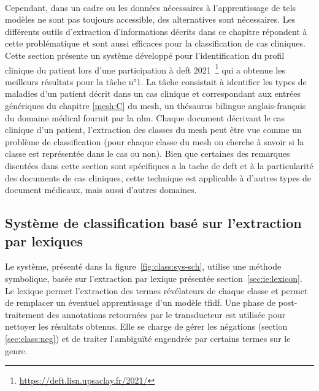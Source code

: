 \paragraph{}
Cependant, dans un cadre ou les données nécessaires à l'apprentissage de tels modèles ne sont pas toujours accessible, des alternatives sont nécessaires.
Les différents outils d'extraction d'informations décrits dans ce chapitre répondent à cette problématique et sont aussi efficaces pour la classification de cas cliniques.
Cette section présente un système développé pour l'identification du profil clinique du patient \cite{hiotDOINGDEFTUtilisation2021} lors d'une participation à \gls{deft} 2021~\footnote{\url{https://deft.lisn.upsaclay.fr/2021/}} \cite{grouinClassificationCasCliniques2021} qui a obtenue les meilleurs résultats pour la tâche n°1.
La tâche consistait à identifier les types de maladies d'un patient décrit dans un cas clinique et correspondant aux entrées génériques du chapitre \ref{mesh:C} du \gls{mesh}, un thésaurus bilingue anglais-français du domaine médical fournit par la \gls{nlm}.
Chaque document décrivant le cas clinique d'un patient, l'extraction des classes du \gls{mesh} peut être vue comme un problème de classification (pour chaque classe du \gls{mesh} on cherche à savoir si la classe est représentée dans le cas ou non).
Bien que certaines des remarques discutées dans cette section sont spécifiques a la tache de \gls{deft} et à la particularité des documents de cas cliniques, cette technique est applicable à d'autres types de document médicaux, mais aussi d'autres domaines.

\subsection{Système de classification basé sur l'extraction par lexiques}
Le système, présenté dans la figure~\ref{fig:class:sys-sch}, utilise une méthode symbolique, basée sur l'extraction par lexique présentée section~\ref{sec:ie:lexicon}.
Le lexique permet l'extraction des termes révélateurs de chaque classe et permet de remplacer un éventuel apprentissage d'un modèle \gls{tfidf}.
Une phase de post-traitement des annotations retournées par le transducteur est utilisée pour nettoyer les résultats obtenus.
Elle se charge de gérer les négations (section \ref{sec:class:neg}) et de traiter l'ambiguïté engendrée par certains termes sur le genre.

